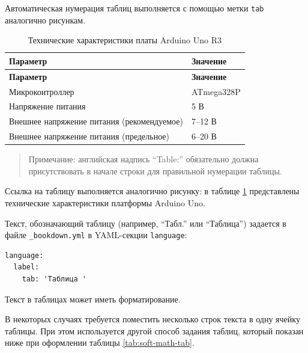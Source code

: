 \documentclass[
  a4paper,
]{book}
\theoremstyle{definition}
\theoremstyle{definition}
\theoremstyle{definition}
\theoremstyle{definition}
\theoremstyle{remark}
\begin{document}
Автоматическая нумерация таблиц выполняется с помощью метки \texttt{tab} аналогично рисункам.

\begin{longtable}[]{@{}ll@{}}
\caption{\label{tab:uno-tech} Технические характеристики платы Arduino Uno R3}\tabularnewline
\toprule\noalign{}
\textbf{Параметр} & \textbf{Значение} \\
\midrule\noalign{}
\endfirsthead
\toprule\noalign{}
\textbf{Параметр} & \textbf{Значение} \\
\midrule\noalign{}
\endhead
\bottomrule\noalign{}
\endlastfoot
Микроконтроллер & ATmega328P \\
Напряжение питания & 5 В \\
Внешнее напряжение питания (рекомендуемое) & 7--12 В \\
Внешнее напряжение питания (предельное) & 6--20 В \\
\end{longtable}

\begin{quote}
Примечание: английская надпись ``Table:'' обязательно должна присутствовать в начале строки для правильной нумерации таблицы.
\end{quote}

Ссылка на таблицу выполняется аналогично рисунку: в таблице \ref{tab:uno-tech} представлены технические характеристики платформы Arduino Uno.

Текст, обозначающий таблицу (например, ``Табл.'' или ``Таблица'') задается в файле \texttt{\_bookdown.yml} в YAML-секции \texttt{language}:

\begin{verbatim}
language:
  label:
    tab: 'Таблица '
\end{verbatim}

Текст в таблицах может иметь форматирование.

В некоторых случаях требуется поместить несколько строк текста в одну ячейку таблицы. При этом используется другой способ задания таблиц, который показан ниже при оформлении таблицы \ref{tab:soft-math-tab}.
\end{document}
